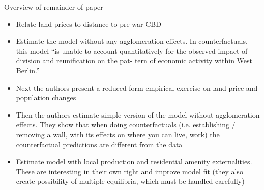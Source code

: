 \documentclass[10pt,notes=hide]{beamer}
\begin{document}
\begin{frame}{Overview of remainder of paper}
\begin{itemize}
\item Relate land prices to distance to pre-war CBD
\item Estimate the model without any agglomeration effects. In counterfactuals, this model ``is unable to account quantitatively for the observed impact of division and reunification on the pat- tern of economic activity within West Berlin.''
\item 
Next the authors present a reduced-form empirical exercise on land price and population changes
\item Then the authors estimate simple version of the model without agglomeration effects. They show that when doing counterfactuals (i.e. establishing / removing a wall, with its effects on where you can live, work) the counterfactual predictions are different from the data 
\item Estimate model with local production and residential amenity externalities. These are interesting in their own right and improve model fit (they also create possibility of multiple equilibria, which must be handled carefully)
%
%
\end{itemize}
\end{frame}
%
%
%
\end{document}
